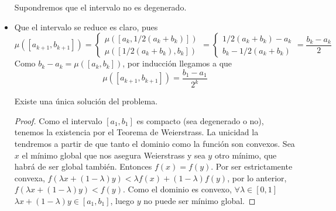 \documentclass[twoside]{article}
\begin{document}
\begin{solucion}
\begin{itemize}
Supondremos que el intervalo no es degenerado.
\item Que el intervalo se reduce es claro, pues
$$\mu([a_{k+1},b_{k+1}]) = \begin{cases}
\mu([a_k,1/2(a_k+b_k)])\\
\mu([1/2(a_k+b_k),b_k])
\end{cases}
= \begin{cases}
1/2(a_k+b_k)-a_k\\
b_k - 1/2(a_k+b_k)
\end{cases} = \frac{b_k-a_k}{2}
$$
Como $b_k-a_k = \mu([a_k,b_k])$, por inducción llegamos a que
$$
\mu([a_{k+1},b_{k+1}]) = \frac{b_1-a_1}{2^k}
$$
\begin{lemma}
Existe una única solución del problema.

\begin{proof}
Como el intervalo $[a_1,b_1]$ es compacto (sea degenerado o no), tenemos la existencia por el Teorema de Weierstrass. La unicidad la tendremos a partir de que tanto el dominio como la función son convexos. Sea $x$ el mínimo global que nos asegura Weierstrass y sea $y$ otro mínimo, que habrá de ser global también. Entonces $f(x)=f(y)$. Por ser estrictamente convexa, $f(\lambda x+(1-\lambda)y) < \lambda f(x)+(1-\lambda)f(y)$, por lo anterior, $f(\lambda x+(1-\lambda)y) < f(y)$. Como el dominio es convexo, $\forall \lambda \in[0,1]$ $\lambda x+(1-\lambda)y \in [a_1,b_1]$, luego $y$ no puede ser mínimo global. 
\end{proof}

\end{lemma}


\end{itemize}
\end{solucion}
\end{document}
